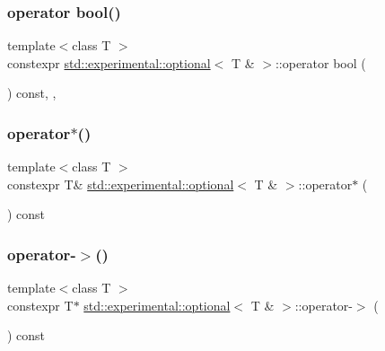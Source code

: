 \subsubsection{\texorpdfstring{operator bool()}{operator bool()}}
{\footnotesize\ttfamily template$<$class T $>$ \\
constexpr \mbox{\hyperlink{classstd_1_1experimental_1_1optional}{std\+::experimental\+::optional}}$<$ T \& $>$\+::operator bool (\begin{DoxyParamCaption}{ }\end{DoxyParamCaption}) const\hspace{0.3cm}{\ttfamily [inline]}, {\ttfamily [explicit]}, {\ttfamily [noexcept]}}

\mbox{\label{classstd_1_1experimental_1_1optional_3_01_t_01_6_01_4_ad9598e2a7490692f6469ee4e42b1da7b}} 
\subsubsection{\texorpdfstring{operator$\ast$()}{operator*()}}
{\footnotesize\ttfamily template$<$class T $>$ \\
constexpr T\& \mbox{\hyperlink{classstd_1_1experimental_1_1optional}{std\+::experimental\+::optional}}$<$ T \& $>$\+::operator$\ast$ (\begin{DoxyParamCaption}{ }\end{DoxyParamCaption}) const\hspace{0.3cm}{\ttfamily [inline]}}

\mbox{\label{classstd_1_1experimental_1_1optional_3_01_t_01_6_01_4_af84c2ce49c2b8f8288b9ff92087bd2a5}} 
\subsubsection{\texorpdfstring{operator-\/$>$()}{operator->()}}
{\footnotesize\ttfamily template$<$class T $>$ \\
constexpr T$\ast$ \mbox{\hyperlink{classstd_1_1experimental_1_1optional}{std\+::experimental\+::optional}}$<$ T \& $>$\+::operator-\/$>$ (\begin{DoxyParamCaption}{ }\end{DoxyParamCaption}) const\hspace{0.3cm}{\ttfamily [inline]}}

